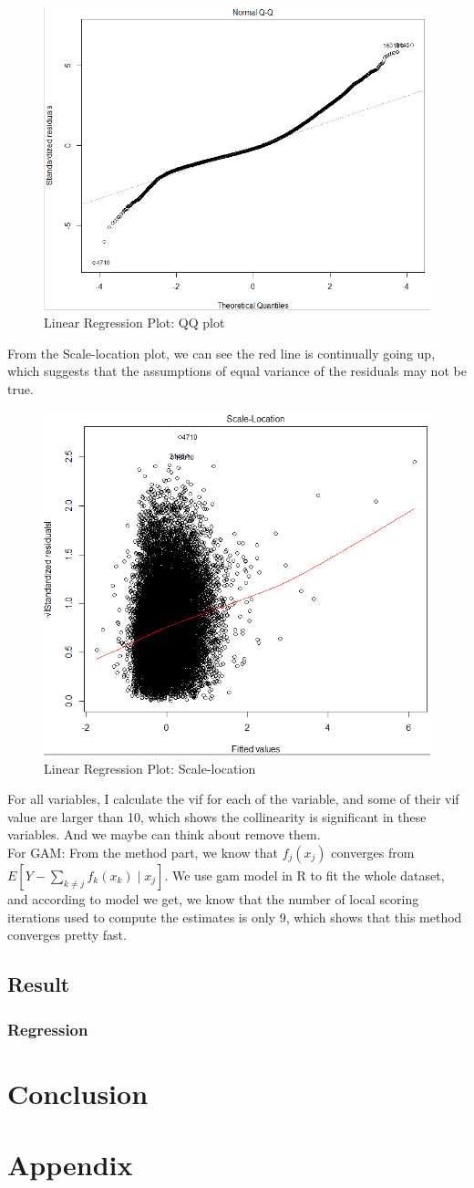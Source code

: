 \documentclass[11pt]{article}
\begin{document}
    \begin{figure}[h]
        \centering
        \includegraphics[width=0.7\linewidth]{linear_qq.png}
        \caption{Linear Regression Plot: QQ plot}
    \end{figure}    
    From the Scale-location plot, we can see the red line is continually going up, which suggests that the assumptions of equal variance of the residuals may not be true.  \\
    \begin{figure}[h]
        \centering
        \includegraphics[width=0.7\linewidth]{linear_sl.png}
        \caption{Linear Regression Plot: Scale-location}
    \end{figure}
    
    For all variables, I calculate the vif for each of the variable, and some of their vif value are larger than 10, which shows the collinearity is significant in these variables. And we maybe can think about remove them. \\ 
For GAM: 
    From the method part, we know that $f_j(x_j)$ converges from $E \left[Y-\sum_{k \neq j}f_k(x_k)\mid{x_j} \right]$. We use gam model in R to fit the whole dataset, and according to model we get, we know that the number of local scoring iterations used to compute the estimates is only 9, which shows that this method converges pretty fast.
\subsection{Result}
\subsubsection{Regression}

\section{Conclusion}

\section{Appendix}
\end{document}

